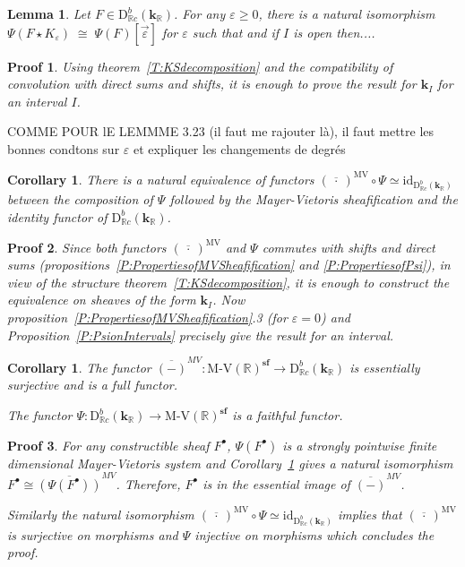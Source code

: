 \documentclass[a4paper, english, 11pt]{article}
\newcommand{\kk}[0]{\textbf{k}}
\newcommand{\0}{\vec{0}}
\newcommand{\R}[0]{\mathbb{R}}
\newcommand{\D}[0]{\text{D}}
\newcommand{\s}{\textbf{sf}}
\newtheorem*{pf}{Proof} }
\newtheorem{cor}[prop]{Corollary}
\newtheorem{lem}[prop]{Lemma}
\begin{document}
\begin{lem}Let $F \in \D^b_{\R c}(\kk_\R)$. For any $\varepsilon \geq 0$, there is a natural isomorphism 
$ \Psi(F \star K_{\varepsilon}) \; \cong \; \Psi(F)[\vec{\varepsilon}]$ for $\varepsilon$ such that and if $I$ is open then....
\end{lem}
\begin{pf}
 Using theorem~\ref{T:KSdecomposition} and the compatibility of convolution with direct sums and shifts, it is enough to prove the result for $\kk_I$ for an interval $I$.
\end{pf}
COMME POUR lE LEMMME 3.23 (il faut me rajouter là), il faut mettre les bonnes condtons sur $\varepsilon$ et expliquer les changements de degrés

\begin{cor}\label{C:MVcircPsiisId}
 There is a natural equivalence of functors 
 $(\overline{~\cdot~ })^{\text{MV}} \circ \Psi\simeq \text{id}_{\D^b_{\R c}(\kk_\R)}$ between the composition of $\Psi$ followed by the Mayer-Vietoris sheafification and the identity functor of $\D^b_{\R c}(\kk_\R)$.
\end{cor}
\begin{pf}
 Since both functors $(\overline{~\cdot~ })^{\text{MV}}$ and $ \Psi $ commutes with shifts and direct sums (propositions~\ref{P:PropertiesofMVSheafification} and \ref{P:PropertiesofPsi}), in view of the structure theorem~\ref{T:KSdecomposition}, it is enough to construct the equivalence on sheaves of the form $\kk_{I}$. Now proposition~\ref{P:PropertiesofMVSheafification}.3 (for $\varepsilon=0$) and Proposition~\ref{P:PsionIntervals} precisely give the result for an interval.
\end{pf}
\begin{cor}\label{C:fullorfiathful}
The functor  $\overline{(-)}^{MV}: \text{M-V}(\R)^{\s} \to  \D^b_{\R c}(\kk_\R)$ is essentially surjective and is a full functor. 

The functor $ \Psi:\D^b_{\R c}(\kk_\R)\to  \text{M-V}(\R)^{\s}$  is a faithful functor. 
\end{cor}
\begin{pf}

For  any    constructible sheaf $F^\bullet$, $\Psi(F^\bullet)$ is a 
strongly pointwise finite dimensional Mayer-Vietoris system and Corollary~\ref{C:MVcircPsiisId} gives a natural isomorphism $F^\bullet \cong \overline{(\Psi(F^\bullet))}^{MV} $. Therefore, $F^\bullet$ is in the essential image of $\overline{(-)}^{MV}$.  

\smallskip

Similarly the natural isomorphism  $(\overline{~\cdot~ })^{\text{MV}} \circ \Psi \simeq \text{id}_{\D^b_{\R c}(\kk_\R)}$ implies that $(\overline{~\cdot~ })^{\text{MV}}$ is surjective on morphisms and  $\Psi$ injective on morphisms which concludes the proof.
\end{pf}
\end{document}
